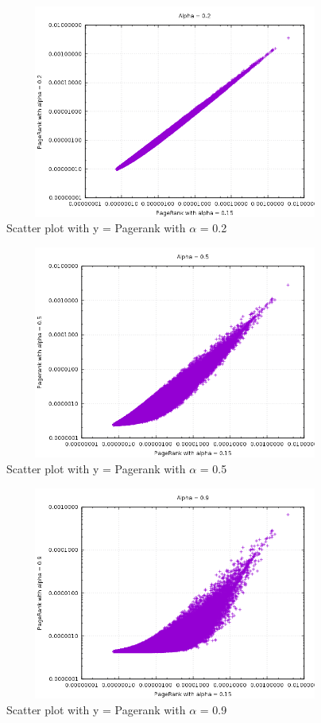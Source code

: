 \documentclass{article}
\begin{document}
\FloatBarrier
\begin{figure}[h!]
\includegraphics[width=12cm, height=7cm]{correlationPart4.png}
  \caption{Scatter plot with y = Pagerank with $\alpha$ = 0.2}
\end{figure}
\FloatBarrier
\begin{figure}[h!]
\includegraphics[width=12cm, height=7cm]{correlationPart5.png}
  \caption{Scatter plot with y = Pagerank with $\alpha$ = 0.5}
\end{figure}
\FloatBarrier
\begin{figure}[h!]
\includegraphics[width=12cm, height=7cm]{correlationPart6.png}
  \caption{Scatter plot with y = Pagerank with $\alpha$ = 0.9}
\end{figure}
\FloatBarrier
\end{document}
